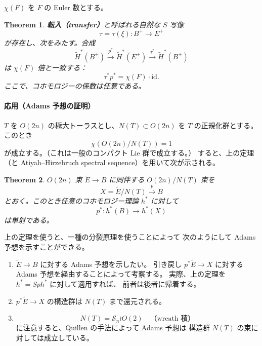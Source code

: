 \documentclass[uplatex,dvipdfmx,a4paper,12pt]{jlreq}
\newtheorem{theorem}{Theorem}
\begin{document}
$\chi(F)$ を $F$ の Euler 数とする。

\begin{theorem}
  \textbf{転入（transfer）}と呼ばれる自然な $S$ 写像
  \[
    \tau = \tau(\xi) : B^+ \longrightarrow E^+
  \]
  が存在し、次をみたす。合成
  \[
    \tilde{H}^*(B^+) \stackrel{p^*}{\longrightarrow}
    \tilde{H}^*(E^+) \stackrel{\tau^*}{\longrightarrow}
    \tilde{H}^*(B^+)
  \]
  は $\chi(F)$ 倍と一致する：
  \[
    \tau^* p^* = \chi(F) \cdot \mathrm{id}.
  \]
  ここで、コホモロジーの係数は任意である。
\end{theorem}

\paragraph{応用（Adams 予想の証明）}

$T$ を $O(2n)$ の極大トーラスとし、$N(T) \subset O(2n)$ を $T$ の正規化群とする。
このとき
\[
  \chi(O(2n)/N(T)) = 1
\]
が成立する。（これは一般のコンパクト Lie 群で成立する。）
すると、上の定理（と Atiyah--Hirzebruch spectral sequence）を用いて次が示される。

\begin{theorem}
  $O(2n)$ 束 $\tilde{E} \to B$ に同伴する $O(2n)/N(T)$ 束を
  \[
    X = \tilde{E}/N(T) \stackrel{p}{\longrightarrow} B
  \]
  とおく。このとき任意のコホモロジー理論 $h^*$ に対して
  \[
    p^* : h^*(B) \longrightarrow h^*(X)
  \]
  は単射である。
\end{theorem}

上の定理を使うと、一種の分裂原理を使うことによって
次のようにして Adams 予想を示すことができる。

\begin{enumerate}
  \item $\tilde{E} \to B$ に対する Adams 予想を示したい。
        引き戻し $p^*\tilde{E} \to X$ に対する Adams 予想を経由することによって考察する。
        実際、上の定理を $h^* = \mathit{Sph}^*$ に対して適用すれば、
        前者は後者に帰着する。
  \item $p^*\tilde{E} \to X$ の構造群は $N(T)$ まで還元される。
  \item \[
          N(T) = \mathcal{S}_n \wr O(2) \quad \text{（wreath 積）}
        \]
        に注意すると、Quillen の手法によって Adams 予想は
        構造群 $N(T)$ の束に対しては成立している。
\end{enumerate}
\end{document}

